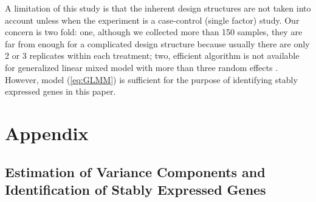 \documentclass[11pt, a4paper]{article}
\begin{document}
A limitation of this study is that the inherent design structures are not taken into account unless when the experiment is a case-control (single factor) study. Our concern is two fold: one, although we collected more than 150 samples, they are far from enough for a complicated design structure because usually there are only 2 or 3 replicates within each treatment;  two, efficient algorithm is not available for generalized linear mixed model with more than three random effects \citep{bolker2009generalized}. However, model (\ref{eq:GLMM}) is sufficient for the purpose of identifying stably expressed genes in this paper.



\section{Appendix}


\subsection*{ Estimation of Variance Components and Identification of Stably Expressed Genes}
\end{document}

